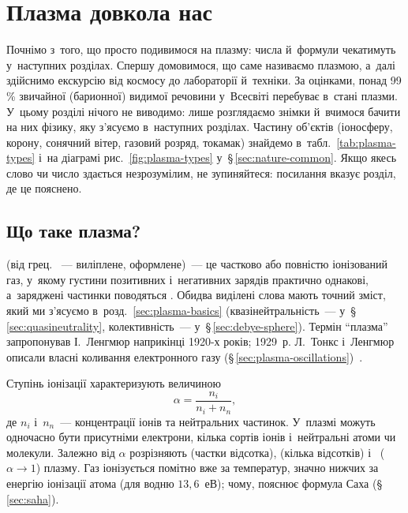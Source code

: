 

\graphicspath{{\currfilebase/Pictures}}

\setcounter{chapter}{-1}
\chapter{Плазма довкола нас}\label{sec:plasma-nature}\hypertarget{plasma-nature}{}

Почнімо з~того, що просто подивимося на плазму: числа й~формули чекатимуть у~наступних розділах. Спершу домовимося, що саме називаємо плазмою, а~далі здійснимо екскурсію від космосу до лабораторії й~техніки.
За оцінками, понад 99\,\% звичайної (барионної) видимої речовини у~Всесвіті перебуває в~стані плазми. У~цьому розділі нічого не виводимо: лише розглядаємо знімки й~вчимося бачити на них фізику,
яку з'ясуємо в~наступних розділах. Частину об'єктів (іоносферу, корону, сонячний вітер, газовий розряд, токамак) знайдемо в~табл.~\ref{tab:plasma-types}
і~на діаграмі рис.~\ref{fig:plasma-types} у~§\,\ref{sec:nature-common}.
Якщо якесь слово чи число здається незрозумілим, не зупиняйтеся: посилання вказує розділ, де це пояснено.

\section{Що таке плазма?}\label{sec:what-is-plasma}

 (від грец. ~--- виліплене, оформлене)~--- це частково або
повністю іонізований газ, у~якому густини позитивних і~негативних зарядів практично
однакові, а~заряджені частинки поводяться . Обидва виділені слова мають
точний зміст, який ми з'ясуємо в~розд.~\ref{sec:plasma-basics} (квазінейтральність~--- у~§\,\ref{sec:quasineutrality},
колективність~--- у~§\,\ref{sec:debye-sphere}). Термін \enquote{плазма} запропонував
І.~Ленгмюр наприкінці 1920-х років; 1929~р. Л.~Тонкс і~Ленгмюр описали власні коливання
електронного газу (§\,\ref{sec:plasma-oscillations})~\cite{chen2016introduction}.

Ступінь іонізації характеризують величиною
\begin{equation}\label{eq:ionization-degree}
	\alpha = \frac{n_i}{n_i + n_n},
\end{equation}
де $n_i$ і~$n_n$~--- концентрації іонів та нейтральних частинок. У~плазмі можуть одночасно
бути присутніми електрони, кілька сортів іонів і~нейтральні атоми чи молекули. Залежно від
$\alpha$ розрізняють  (частки відсотка),  (кілька відсотків) і~ ($\alpha\to1$) плазму.
Газ іонізується помітно вже за температур, значно нижчих за енергію іонізації атома (для водню $13{,}6$~еВ); чому, пояснює формула Саха (§\,\ref{sec:saha}).

